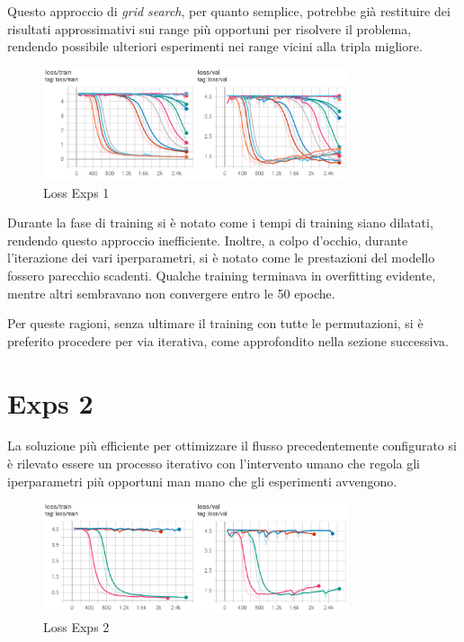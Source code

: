 Questo approccio di \emph{grid search}, per quanto semplice, potrebbe già restituire dei risultati approssimativi sui range più opportuni per risolvere il problema, rendendo possibile ulteriori esperimenti nei range vicini alla tripla migliore. 

\begin{figure}[htbp]
    \centering
    \includegraphics[width=0.8\textwidth]{images/exps1_loss.png}
    \caption{Loss Exps 1}
    \label{fig:exps1_loss}
\end{figure}

Durante la fase di training si è notato come i tempi di training siano dilatati, rendendo questo approccio inefficiente. Inoltre, a colpo d'occhio, durante l'iterazione dei vari iperparametri, si è notato come le prestazioni del modello fossero parecchio scadenti. Qualche training terminava in overfitting evidente, mentre altri sembravano non convergere entro le 50 epoche.

Per queste ragioni, senza ultimare il training con tutte le permutazioni, si è preferito procedere per via iterativa, come approfondito nella sezione successiva.

\section{Exps 2}

La soluzione più efficiente per ottimizzare il flusso precedentemente configurato si è rilevato essere un processo iterativo con l'intervento umano che regola gli iperparametri più opportuni man mano che gli esperimenti avvengono.

\begin{figure}[htbp]
    \centering
    \includegraphics[width=0.8\textwidth]{images/exps2_loss.png}
    \caption{Loss Exps 2}
    \label{fig:exps1_loss}
\end{figure}

